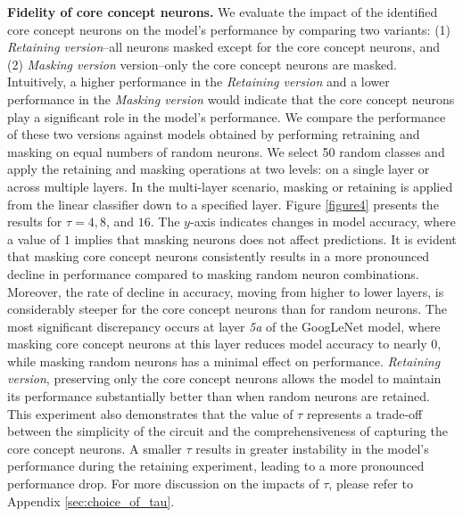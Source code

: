 \noindent \textbf{Fidelity of core concept neurons.} 
\label{sec:fidelity}
We evaluate the impact of the identified core concept neurons on the model's performance by comparing two variants: (1) \emph{Retaining version}--all neurons masked except for the core concept neurons, and (2) \emph{Masking version} version--only the core concept neurons are masked. 
Intuitively, a higher performance in the \emph{Retaining version} and a lower performance in the \emph{Masking version} would indicate that the core concept neurons play a significant role in the model's performance. We compare the performance of these two versions against models obtained by performing retraining and masking on equal numbers of random neurons.
We select 50 random classes and apply the retaining and masking operations at two levels: on a single layer or across multiple layers. In the multi-layer scenario, masking or retaining is applied from the linear classifier down to a specified layer.
Figure \ref{figure4} presents the results for $\tau = 4, 8$, and $16$. The $y$-axis indicates changes in model accuracy, where a value of $1$ implies that masking neurons does not affect predictions.
It is evident that masking core concept neurons consistently results in a more pronounced decline in performance compared to masking random neuron combinations. Moreover, the rate of decline in accuracy, moving from higher to lower layers, is considerably steeper for the core concept neurons than for random neurons. 
The most significant discrepancy occurs at layer \emph{5a} of the GoogLeNet model, where masking core concept neurons at this layer reduces model accuracy to nearly $0$, while masking random neurons has a minimal effect on performance. \emph{Retaining version}, preserving only the core concept neurons allows the model to maintain its performance substantially better than when random neurons are retained. 
This experiment also demonstrates that the value of $\tau$ represents a trade-off between the simplicity of the circuit and the comprehensiveness of capturing the core concept neurons.
A smaller $\tau$ results in greater instability in the model’s performance during the retaining experiment, leading to a more pronounced performance drop. For more discussion on the impacts of $\tau$, please refer to Appendix \ref{sec:choice_of_tau}.

